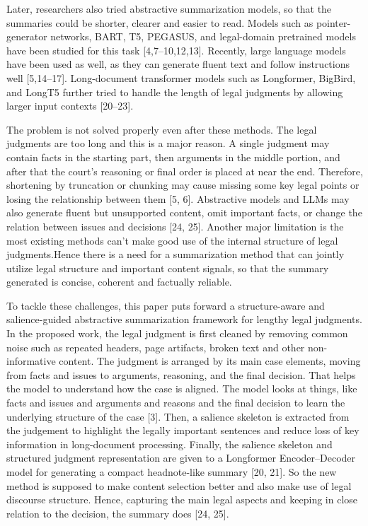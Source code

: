 \documentclass[11pt, a4paper]{article}
\theoremstyle{plain}%
\theoremstyle{remark}%
\theoremstyle{definition}%
\begin{document}
Later, researchers also tried abstractive summarization models, so that the summaries could be shorter, clearer and easier to read. Models such as pointer-generator networks, BART, T5, PEGASUS, and legal-domain pretrained models have been studied for this task [4,7–10,12,13]. Recently, large language models have been used as well, as they can generate fluent text and follow instructions well [5,14–17]. Long-document transformer models such as Longformer, BigBird, and LongT5 further tried to handle the length of legal judgments by allowing larger input contexts [20–23].

The problem is not solved properly even after these methods. The legal judgments are too long and this is a major reason. A single judgment may contain facts in the starting part, then arguments in the middle portion, and after that the court's reasoning or final order is placed at near  the end. Therefore, shortening by truncation or chunking may cause missing some key legal points or losing the relationship between them [5, 6]. Abstractive models and LLMs may also generate fluent but unsupported content, omit important facts, or change the relation between issues and decisions [24, 25]. Another major limitation is the most existing methods can't make good use of the internal structure of legal judgments.Hence there is a need for a summarization method that can jointly utilize legal structure and important content signals, so that the summary generated is concise, coherent and factually reliable.

To tackle these challenges, this paper puts forward a structure-aware and salience-guided abstractive summarization framework for lengthy legal judgments. In the proposed work, the legal judgment is first cleaned by removing common noise such as repeated headers, page artifacts, broken text and other non-informative content. The judgment is arranged by its main case elements, moving from facts and issues to arguments, reasoning, and the final decision. That helps the model to understand how the case is aligned. The model looks at things, like facts and issues and arguments and reasons and the final decision to learn the underlying structure of the case [3]. Then, a salience skeleton is extracted from the judgement to highlight the legally important sentences and reduce loss of key information in long-document processing. Finally, the salience skeleton and structured judgment representation are given to a Longformer Encoder–Decoder model for generating a compact headnote-like summary [20, 21]. So the new method is supposed to make content selection better and also make use of legal discourse structure. Hence, capturing the main legal aspects and keeping in close relation to the decision, the summary does [24, 25].
\end{document}
